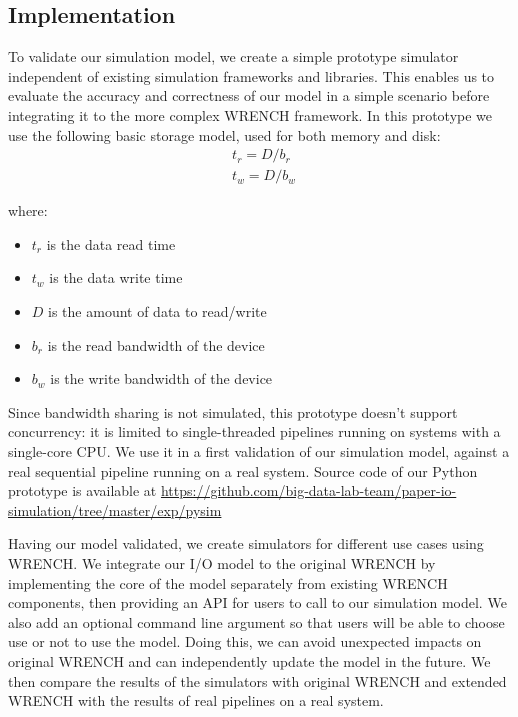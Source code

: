 \documentclass[conference]{IEEEtran}
\begin{document}
		\subsection{Implementation}

			To validate our simulation model, we create a simple prototype
			simulator independent of existing simulation frameworks and libraries. 
			This enables us to evaluate the accuracy and correctness of our 
			model in a simple scenario before integrating it to the more complex WRENCH framework. 
			In this prototype we use the following basic storage model, used for both memory and disk: 
			\begin{align*}
				& t_{r} = D / b_r \\ 
				& t_{w} = D / b_w\
			\end{align*}		
			
			where:
			\begin{itemize}
				\item $t_{r}$ is the data read time
				\item $t_{w}$ is the data write time
				\item $D$ is the amount of data to read/write
				\item $b_r$ is the read bandwidth of the device
				\item $b_w$ is the write bandwidth of the device
			\end{itemize}			

			Since bandwidth sharing is not simulated, this prototype doesn't support 
			concurrency: it is limited to single-threaded pipelines running on systems 
			with a single-core CPU. We use it in a first validation of our simulation 
			model, against a real sequential pipeline running on a real system.
			Source code of our Python prototype is available at 
            \url{https://github.com/big-data-lab-team/paper-io-simulation/tree/master/exp/pysim}
			
			Having our model validated, we create simulators for different use cases 
			using WRENCH.
			We integrate our I/O model to the original WRENCH by implementing 
			the core of the model separately from existing WRENCH components, 
			then providing an API for users to call to our simulation model. 
			We also add an optional command line argument so that users will be able 
			to choose use or not to use the model. Doing this, we can avoid 
			unexpected impacts on original WRENCH and can independently update 
			the model in the future. 
			We then compare the results of the simulators with
			original WRENCH and extended WRENCH with the results of real
			pipelines on a real system. 
		
\end{document}
